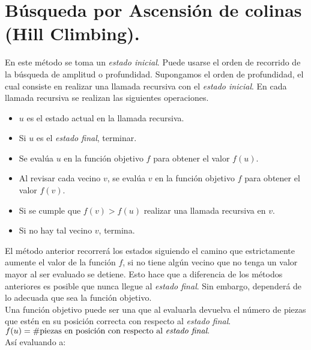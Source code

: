\documentclass[12pt]{article}
\def \L {2.}
\begin{document}
	\section{Búsqueda por Ascensión de colinas (Hill Climbing).}
	En este método se toma un \textit{estado inicial}. Puede usarse el orden de recorrido de la búsqueda de amplitud o profundidad. Supongamos el orden de profundidad, el cual consiste en realizar una llamada recursiva con el \textit{estado inicial}. En cada llamada recursiva se realizan las siguientes operaciones.
	\begin{itemize}
		\item $u$ es el estado actual en la llamada recursiva.
		\item Si $u$ es el \textit{estado final}, terminar.
		\item Se evalúa $u$ en la función objetivo $f$ para obtener el valor $f(u)$.
		\item Al revisar cada vecino $v$, se evalúa $v$ en la función objetivo $f$ para obtener el valor $f(v)$.
		\item Si se cumple que $f(v) > f(u)$ realizar una llamada recursiva en $v$.
		\item Si no hay tal vecino $v$, termina.
	\end{itemize}
	El método anterior recorrerá los estados siguiendo el camino que estrictamente aumente el valor de la función $f$, si no tiene algún vecino que no tenga un valor mayor al ser evaluado se detiene. Esto hace que a diferencia de los métodos anteriores es posible que nunca llegue al \textit{estado final}. Sin embargo, dependerá de lo adecuada que sea la función objetivo.\\
	Una función objetivo puede ser una que al evaluarla devuelva el número de piezas que estén en su posición correcta con respecto al \textit{estado final}.
	\\$f(u) = \# \text{piezas en posición con respecto al \textit{estado final}.}$\\
	Así evaluando a:\\
\end{document}

